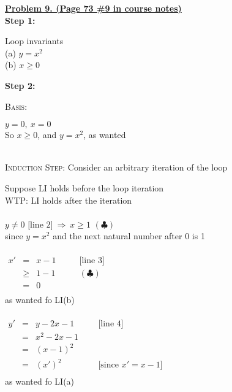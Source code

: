 \documentclass[12pt]{article}
\begin{document}
\newpage
{\LARGE \noindent \underline{\textbf{Problem 9. (Page 73 \#9 in course notes)}}}\\

\noindent \textbf{Step 1:}

\hfill\begin{minipage}{\dimexpr\textwidth-10mm}
	Loop invariants\\
	\hspace*{10 pt} (a) $y = x^2$\\
	\hspace*{10 pt} {(b) $x \geq 0$}\\
\end{minipage}
\textbf{Step 2:} %

\hfill\begin{minipage}{\dimexpr\textwidth-10mm}
	\textsc{Basis:}

	\hfill\begin{minipage}{\dimexpr\textwidth-10mm}
		$y = 0, \ x = 0$\\
		So $x\geq 0$, and $y =x^2$, as wanted
	\end{minipage}\\

	\textsc{Induction Step:} Consider an arbitrary iteration of the loop

	\hfill\begin{minipage}{\dimexpr\textwidth-10mm}
		Suppose LI holds before the loop iteration \qquad [IH]\\
		WTP: LI holds after the iteration
		\\\\
		$y \not = 0 \text{ [line 2]}\ \Longrightarrow \ x \geq 1$ \qquad $(\clubsuit)$\\
		since $y = x^2$ and the next natural number after 0 is 1
		\\\\
		$\begin{array}{lcll}
				x' & =    & x-1          & \text{[line 3]} \\
				   & \geq & 1 - 1 \qquad & (\clubsuit)     \\
				   & =    & 0            &                 \\
			\end{array}$\\
		as wanted fo LI(b)
		\\\\
		$\begin{array}{lcll}
				y' & = & y-2x-1 \qquad & \text{[line 4]}         \\
				   & = & x^2 -2x -1    &                         \\
				   & = & (x-1)^2       &                         \\
				   & = & (x')^2        & \text{[since $x'=x-1$]} \\
			\end{array}$\\
		as wanted fo LI(a)
	\end{minipage}
\end{minipage}\\\\
\end{document}
